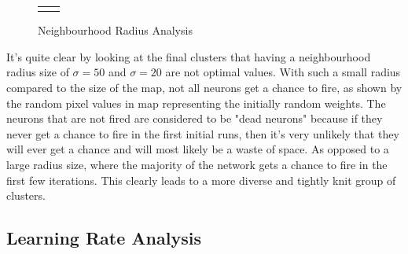 \documentclass{IEEEtran}
\begin{document}
\begin{figure}[!htbp]
\begin{tabular}{cc}
\begin{minipage}{100pt}
\caption{$\sigma=20$}
\label{fig:2}
\end{minipage}
\end{tabular}
\caption{Neighbourhood Radius Analysis}
\end{figure} 


It's quite clear by looking at the final clusters that having a neighbourhood radius size of $\sigma = 50$ and $\sigma = 20$ are not optimal values. With such a small radius compared to the size of the map, not all neurons get a chance to fire, as shown by the random pixel values in map representing the initially random weights. The neurons that are not fired are considered to be "dead neurons" because  if they never get a chance to fire in the first initial runs, then it's very unlikely that they will ever get a chance and will most likely be a waste of space. As opposed to a large radius size, where the majority of the network gets a chance to fire in the first few iterations. This clearly leads to a more diverse and tightly knit group of clusters. 

\subsection{Learning Rate Analysis}
\end{document}
